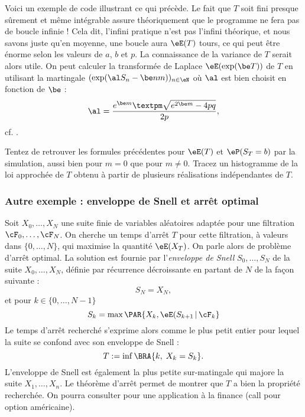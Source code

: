 {{%

Voici un exemple de code \ML{} illustrant ce qui précède. Le fait que
$T$ soit fini presque sûrement et même intégrable assure théoriquement
que le programme ne fera pas de boucle infinie !  Cela dit, l'infini
pratique n'est pas l'infini théorique, et nous savons juste qu'en
moyenne, une boucle aura $\eE(T)$ tours, ce qui peut être énorme selon
les valeurs de $a$, $b$ et $p$.  La connaissance de la variance de $T$
serait alors utile. On peut calculer la transformée de Laplace
$\eE(\exp(\be T))$ de $T$ en utilisant la martingale $(\exp(\al
S_n-\be n m))_{n\in\eN}$ où $\al$ est bien choisit en fonction de
$\be$ :
$$
\al=\frac{e^{\be m}±\sqrt{e^{2\be m}-4pq}}{2p},
$$
cf. \cite[exercice 8.8 page 247]{cottrell-duhamel}.

%
% 

Tentez de retrouver les formules précédentes pour $\eE(T)$ et
$\eP(S_T=b)$ par la simulation, aussi bien pour $m=0$ que pour $m\neq
0$. Tracez un histogramme de la loi approchée de $T$ obtenu à partir
de plusieurs réalisations indépendantes de $T$.

%
\subsubsection{Autre exemple : enveloppe de Snell et arrêt optimal}
%

Soit $X_0,\ldots,X_N$ une suite finie de variables aléatoires adaptée
pour une filtration $\cF_0,\ldots,\cF_N$. On cherche un temps d'arrêt
$T$ pour cette filtration, à valeurs dans $\{0,\ldots,N\}$, qui
maximise la quantité $\eE(X_T)$. On parle alors de problème d'arrêt
optimal. La solution est fournie par l'\emph{enveloppe de Snell}
$S_0,\ldots,S_N$ de la suite $X_0,\ldots,X_N$, définie par récurrence
décroissante en partant de $N$ de la façon suivante :
$$
S_N=X_N,
$$
et pour $k \in \{0,\ldots,N-1\}$
$$
S_k=\max\PAR{X_k,\eE(S_{k+1}\,\vert\,\cF_k}
$$
Le temps d'arrêt recherché s'exprime alors comme le plus petit entier
pour lequel la suite se confond avec son enveloppe de Snell :
$$
T:=\inf\BRA{k,\; X_k=S_k}.
$$
L'enveloppe de Snell est également la plus petite sur-matingale qui
majore la suite $X_1,\ldots,X_n$. Le théorème d'arrêt permet de
montrer que $T$ a bien la propriété recherchée.  On pourra consulter
\cite{lamberton-lapeyre} pour une application à la finance (call pour
option américaine).

}}
